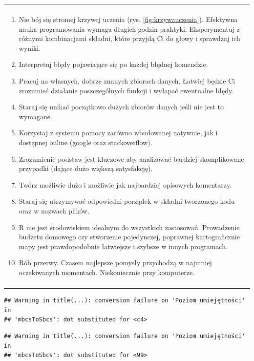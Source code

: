 \documentclass[]{book}
\providecommand{\tightlist}{%
  \setlength{\itemsep}{0pt}\setlength{\parskip}{0pt}}
\newenvironment{foo}
    {\begin{center}
    \begin{tabular}{|p{0.9\textwidth}|}
    \hline\\
    }
    {
    \\\\\hline
    \end{tabular}
    \end{center}
    }
\theoremstyle{definition}
\theoremstyle{definition}
\theoremstyle{definition}
\theoremstyle{remark}
\begin{document}
\begin{foo}
\begin{enumerate}
\def\labelenumi{\arabic{enumi}.}
\tightlist
\item
  Nie bój się stromej krzywej uczenia (rys. \ref{fig:krzywauczenia}).
  Efektywna nauka programowania wymaga długich godzin praktyki.
  Eksperymentuj z różnymi kombinacjami składni, które przyjdą Ci do
  głowy i sprawdzaj ich wyniki.
\item
  Interpretuj błędy pojawiające się po każdej błędnej komendzie.
\item
  Pracuj na własnych, dobrze znanych zbiorach danych. Łatwiej będzie Ci
  zrozumieć działanie poszczególnych funkcji i wyłapać ewentualne błędy.
\item
  Staraj się unikać początkowo dużych zbiorów danych jeśli nie jest to
  wymagane.
\item
  Korzystaj z systemu pomocy zarówno wbudowanej natywnie, jak i
  dostępnej online (google oraz stackoverflow).
\item
  Zrozumienie podstaw jest kluczowe aby analizować bardziej
  skomplikowane przypadki (dające dużo większą satysfakcję).
\item
  Twórz możliwie dużo i możliwie jak najbardziej opisowych komentarzy.
\item
  Staraj się utrzymywać odpowiedni porządek w składni tworzonego kodu
  oraz w nazwach plików.
\item
  R nie jest środowiskiem idealnym do wszystkich zastosowań. Prowadzenie
  budżetu domowego czy stworzenie pojedynczej, poprawnej kartograficznie
  mapy jest prawdopodobnie łatwiejsze i szybsze w innych programach.
\item
  Rób przerwy. Czasem najlepsze pomysły przychodzą w najmniej
  oczekiwanych momentach. Niekoniecznie przy komputerze.
\end{enumerate}
\end{foo}

\label{fig:krzywauczenia}

\begin{verbatim}
## Warning in title(...): conversion failure on 'Poziom umiejętności' in
## 'mbcsToSbcs': dot substituted for <c4>
\end{verbatim}

\begin{verbatim}
## Warning in title(...): conversion failure on 'Poziom umiejętności' in
## 'mbcsToSbcs': dot substituted for <99>
\end{verbatim}
\end{document}
